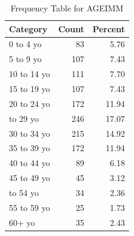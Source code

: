 \begin{table}[!h]
\centering
\caption{\label{tab:tab:AGEIMM}Frequency Table for AGEIMM}
\centering
\begin{tabular}[t]{lrr}
\toprule
Category & Count & Percent\\
\midrule
0 to 4 yo & 83 & 5.76\\
5 to 9 yo & 107 & 7.43\\
10 to 14 yo & 111 & 7.70\\
15 to 19 yo & 107 & 7.43\\
20 to 24 yo & 172 & 11.94\\
\addlinespace
25 to 29 yo & 246 & 17.07\\
30 to 34 yo & 215 & 14.92\\
35 to 39 yo & 172 & 11.94\\
40 to 44 yo & 89 & 6.18\\
45 to 49 yo & 45 & 3.12\\
\addlinespace
50 to 54 yo & 34 & 2.36\\
55 to 59 yo & 25 & 1.73\\
60+ yo & 35 & 2.43\\
\bottomrule
\end{tabular}
\end{table}

